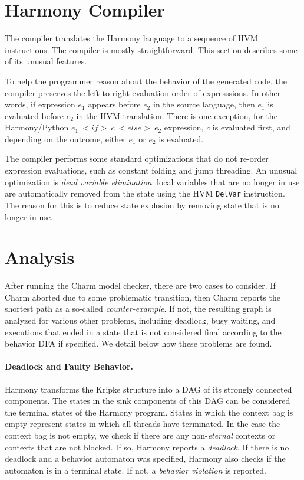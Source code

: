 \documentclass[twocolumn]{article}
\begin{document}
\section{Harmony Compiler}

The compiler translates the Harmony language to a sequence of HVM
instructions.  The compiler is mostly straightforward.  This section
describes some of its unusual features.

To help the programmer reason about the behavior of the generated code,
the compiler preserves the left-to-right evaluation order of
expresssions.  In other words, if expression $e_1$ appears before
$e_2$ in the source language, then $e_1$ is evaluated before $e_2$
in the HVM translation.  There is one exception, for the Harmony/Python
$e_1~<{if}>~c~<{else}>~e_2$ expression, $c$ is evaluated first, and
depending on the outcome, either $e_1$ or $e_2$ is evaluated.

The compiler performs some standard optimizations that do not re-order
expression evaluations, such as constant folding and jump threading.
An unusual optimization is \emph{dead variable elimination}:
local variables that are no longer in use are automatically removed
from the state using the HVM \texttt{DelVar} instruction.  The reason
for this is to reduce state explosion by removing state that is no
longer in use.

\section{Analysis}

After running the Charm model checker, there are two cases to
consider.  If Charm aborted due to some problematic transition,
then Charm reports the shortest path as a so-called \emph{counter-example}.
If not, the resulting graph is analyzed for various other problems,
including deadlock, busy waiting, and executions
that ended in a state that is not considered final according to the
behavior DFA if specified.  We detail below how these problems are
found.

\paragraph{Deadlock and Faulty Behavior.}

Harmony transforms the Kripke structure into a DAG of its strongly
connected components.  The states in the sink components of this
DAG can be considered the terminal states of the Harmony program.
States in which the context bag is empty represent states in which
all threads have terminated.  In the case the context bag is not
empty, we check if there are any non-\emph{eternal} contexts or
contexts that are not blocked.
If so, Harmony reports a \emph{deadlock}. If there
is no deadlock and a behavior automaton was specified, Harmony also
checks if the automaton is in a terminal state.  If not, a
\emph{behavior violation} is reported.
\end{document}
